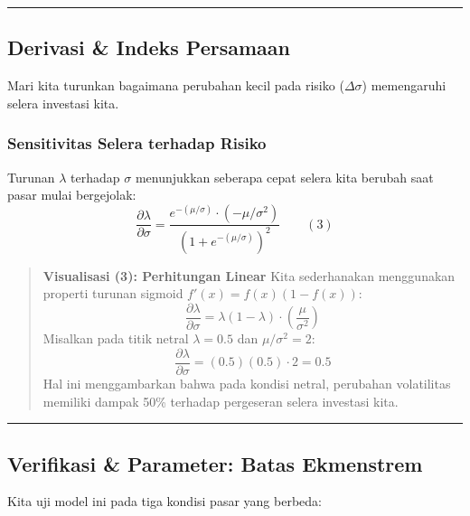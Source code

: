 \begin{center}\rule{0.5\linewidth}{0.5pt}\end{center}

\hypertarget{derivasi-indeks-persamaan}{%
\subsection{Derivasi \& Indeks Persamaan}\label{derivasi-indeks-persamaan}}

Mari kita turunkan bagaimana perubahan kecil pada risiko (\(\Delta \sigma\)) memengaruhi selera investasi kita.

\hypertarget{a.-sensitivitas-selera-terhadap-risiko}{%
\subsubsection{Sensitivitas Selera terhadap Risiko}\label{a.-sensitivitas-selera-terhadap-risiko}}

Turunan \(\lambda\) terhadap \(\sigma\) menunjukkan seberapa cepat selera kita berubah saat pasar mulai bergejolak: \[ \frac{\partial \lambda}{\partial \sigma} = \frac{e^{-(\mu/\sigma)} \cdot (-\mu/\sigma^2)}{(1 + e^{-(\mu/\sigma)})^2} \qquad (3) \]

\begin{quote}
\textbf{Visualisasi (3): Perhitungan Linear} Kita sederhanakan menggunakan properti turunan sigmoid \(f'(x) = f(x)(1-f(x))\): \[ \frac{\partial \lambda}{\partial \sigma} = \lambda(1-\lambda) \cdot \left(\frac{\mu}{\sigma^2}\right) \] Misalkan pada titik netral \(\lambda = 0.5\) dan \(\mu/\sigma^2 = 2\): \[ \frac{\partial \lambda}{\partial \sigma} = (0.5)(0.5) \cdot 2 = 0.5 \] Hal ini menggambarkan bahwa pada kondisi netral, perubahan volatilitas memiliki dampak 50\% terhadap pergeseran selera investasi kita.
\end{quote}

\begin{center}\rule{0.5\linewidth}{0.5pt}\end{center}

\hypertarget{verifikasi-parameter-batas-ekstrem}{%
\subsection{Verifikasi \& Parameter: Batas Ekmenstrem}\label{verifikasi-parameter-batas-ekstrem}}

Kita uji model ini pada tiga kondisi pasar yang berbeda:

